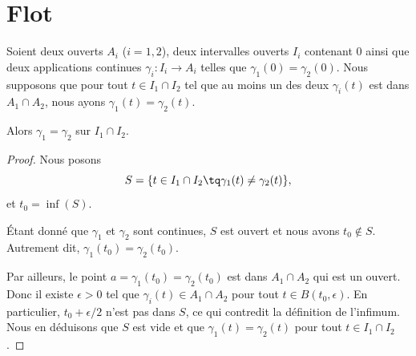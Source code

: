 

\section{Flot}

\begin{lemma}	\label{LEMooUXWKooKEjyrb}
	Soient deux ouverts \( A_i\) (\( i=1,2\)), deux intervalles ouverts \( I_i\) contenant \( 0\) ainsi que deux applications continues \(\gamma_i \colon I_i\to A_i  \) telles que \( \gamma_1(0)=\gamma_2(0)\). Nous supposons que pour tout \( t\in I_1\cap I_2\) tel que au moins un des deux \( \gamma_i(t)\) est dans \( A_1\cap A_2\), nous ayons \( \gamma_1(t)=\gamma_2(t)\).

	Alors \( \gamma_1=\gamma_2\) sur \( I_1\cap I_2\).
\end{lemma}

\begin{proof}
	Nous posons
	\begin{equation}
		S=\{ t\in I_1\cap I_2\tq \gamma_1(t)\neq \gamma_2(t) \},
	\end{equation}
	et \( t_0=\inf(S)\).

	Étant donné que \( \gamma_1\) et \( \gamma_2\) sont continues, \( S\) est ouvert et nous avons \( t_0\not\in S\). Autrement dit, \( \gamma_1(t_0)=\gamma_2(t_0)\).

	Par ailleurs, le point \( a=\gamma_1(t_0)=\gamma_2(t_0)\) est dans \( A_1\cap A_2\) qui est un ouvert. Donc il existe \( \epsilon>0\) tel que \( \gamma_i(t)\in A_1\cap A_2\) pour tout \( t\in B(t_0,\epsilon)\). En particulier, \( t_0+\epsilon/2\) n'est pas dans \( S\), ce qui contredit la définition de l'infimum. Nous en déduisons que \( S\) est vide et que \( \gamma_1(t)=\gamma_2(t)\) pour tout \( t\in I_1\cap I_2\).
\end{proof}

